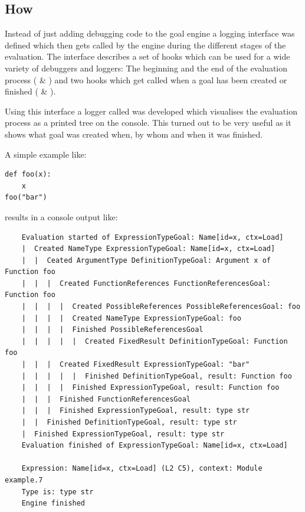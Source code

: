 \documentclass[12pt,halfparskip,DIV11,BCOR10mm]{scrreprt}
\begin{document}
\subsection{How}


Instead of just adding debugging code to the goal engine a logging interface was defined which then gets called by the engine during the different stages of the evaluation. The interface  describes a set of hooks which can be used for a wide variety of debuggers and loggers: The beginning and the end of the evaluation process ( \& ) and two hooks which get called when a goal has been created or finished ( \& ).

Using this interface a logger called  was developed which visualises the evaluation process as a printed tree on the console. This turned out to be very useful as it shows what goal was created when, by whom and when it was finished. 

A simple example like:
\begin{lstlisting}
def foo(x):
    x
foo("bar")
\end{lstlisting}

results in a console output like:
\begin{verbatim}
	Evaluation started of ExpressionTypeGoal: Name[id=x, ctx=Load]
	|  Created NameType ExpressionTypeGoal: Name[id=x, ctx=Load]
	|  |  Ceated ArgumentType DefinitionTypeGoal: Argument x of Function foo
	|  |  |  Created FunctionReferences FunctionReferencesGoal: Function foo
	|  |  |  |  Created PossibleReferences PossibleReferencesGoal: foo
	|  |  |  |  Created NameType ExpressionTypeGoal: foo
	|  |  |  |  Finished PossibleReferencesGoal
	|  |  |  |  |  Created FixedResult DefinitionTypeGoal: Function foo
	|  |  |  Created FixedResult ExpressionTypeGoal: "bar"
	|  |  |  |  |  Finished DefinitionTypeGoal, result: Function foo
	|  |  |  |  Finished ExpressionTypeGoal, result: Function foo
	|  |  |  Finished FunctionReferencesGoal
	|  |  |  Finished ExpressionTypeGoal, result: type str
	|  |  Finished DefinitionTypeGoal, result: type str
	|  Finished ExpressionTypeGoal, result: type str
	Evaluation finished of ExpressionTypeGoal: Name[id=x, ctx=Load]

	Expression: Name[id=x, ctx=Load] (L2 C5), context: Module example.7
	Type is: type str
	Engine finished
\end{verbatim}
\end{document}

